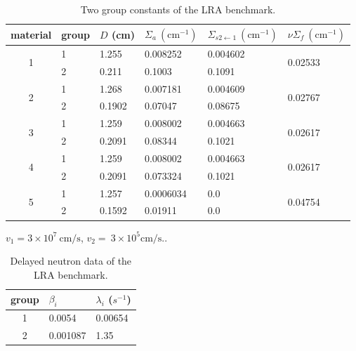 \documentclass[]{interact}
\theoremstyle{plain}%
\theoremstyle{definition}
\theoremstyle{remark}
\begin{document}
\begin{table}[H]
	\begin{threeparttable}	
		\centering
		\begin{tabular}{c|l|l|l|l|l}
			material & group  & $D$ (cm) & $\Sigma_{a} ~ (\text{cm}^{-1})$ & $\Sigma_{s2\gets 1}~ (\text{cm}^{-1})$ & $\nu\Sigma_{f}~ (\text{cm}^{-1})$ \\
			\hline
			\multirow{2}{*}{1}& 1   & 1.255  &  0.008252   & 0.004602 &  \multirow{2}{*}{0.02533} 	\\
			& 2   & 0.211  &  0.1003     &  0.1091  &  \\
			\hline
			\multirow{2}{*}{2}& 1   & 1.268  &  0.007181    & 0.004609  & \multirow{2}{*}{0.02767}  \\	
			& 2   & 0.1902 &  0.07047     & 0.08675   &  \\
			\hline
			
			\multirow{2}{*}{3}& 1   & 1.259  &  0.008002    & 0.004663 & \multirow{2}{*}{0.02617} \\	
			& 2   & 0.2091 &  0.08344     &   0.1021 &                          \\
			\hline
			\multirow{2}{*}{4}& 1   & 1.259  &  0.008002    & 0.004663 &  \multirow{2}{*}{0.02617} \\	
			& 2   & 0.2091 &  0.073324    & 0.1021   &                           \\
			\hline
			\multirow{2}{*}{5}& 1   & 1.257  &  0.0006034   &   0.0    & \multirow{2}{*}{0.04754}\\	
			& 2   & 0.1592 &   0.01911    &   0.0    &  \\
			\hline
		\end{tabular}
		\begin{tablenotes}
			\item $v_1 = 3\times10^{7} ~\text{cm/s} $,  $v_2 = ~3\times10^{5} \text{cm/s}.$.
		\end{tablenotes}
	\end{threeparttable}
	\caption{Two group constants of the LRA benchmark.}
\end{table}


\begin{table}[H]
	\centering
	\begin{tabular}{c|l|l}
		group & $\beta_i$  & $\lambda_i$ ($s^{-1}$)  \\
		\hline
		1    &  0.0054 & 0.00654 \\
		2    &  0.001087 & 1.35  \\
		\hline
	\end{tabular}
	\caption{Delayed neutron data of the LRA benchmark.}
	\label{tab:precursor data}
\end{table}
\end{document}
